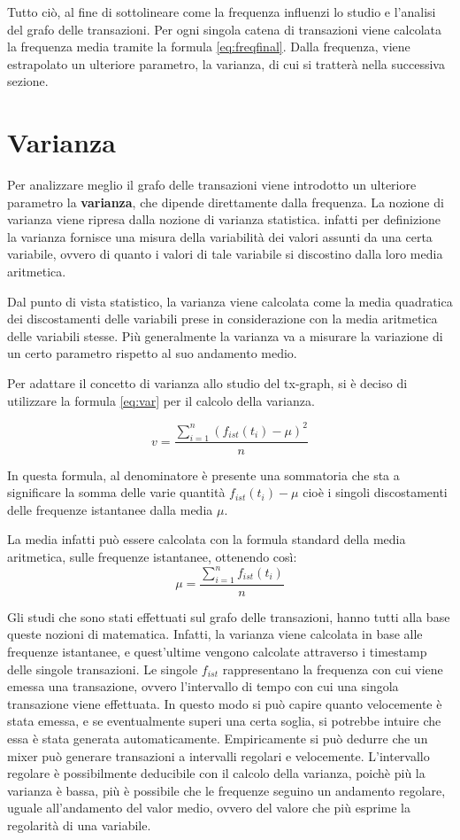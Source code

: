 Tutto ciò, al fine di sottolineare come la frequenza influenzi lo studio e l'analisi del grafo delle transazioni. Per ogni singola catena di transazioni viene calcolata la frequenza media tramite la formula \ref{eq:freqfinal}. Dalla frequenza, viene estrapolato un ulteriore parametro, la varianza, di cui si tratterà nella successiva sezione.

\section{Varianza}
Per analizzare meglio il grafo delle transazioni viene introdotto un ulteriore parametro la \textbf{varianza}, che dipende direttamente dalla frequenza. 
La nozione di varianza viene ripresa dalla nozione di varianza statistica. infatti per definizione la varianza fornisce una misura della variabilità dei valori assunti da una certa variabile, ovvero di quanto i valori di tale variabile si discostino dalla loro media aritmetica. \cite{wiki:varianza}

Dal punto di vista statistico, la varianza viene calcolata come la media quadratica dei discostamenti delle variabili prese in considerazione con la media aritmetica delle variabili stesse. Più generalmente la varianza va a misurare la variazione di un certo parametro rispetto al suo andamento medio.

Per adattare il concetto di varianza allo studio del tx-graph, si è deciso di utilizzare la formula \ref{eq:var} per il calcolo della varianza.

\begin{equation}
v =  \frac{ \sum_{i=1}^n (f_{ist}(t_i) - \mu )^2 }{n}
\label{eq:var}
\end{equation}

In questa formula, al denominatore è presente una sommatoria che sta a significare la somma delle varie quantità $f_{ist}(t_i) - \mu$ cioè i singoli discostamenti delle frequenze istantanee dalla media $\mu$.

La media infatti può essere calcolata con la formula standard della media aritmetica, sulle frequenze istantanee, ottenendo così:
\begin{equation}
	\mu = \frac{\sum_{i=1}^{n} f_{ist}(t_i)}{n}
\end{equation}

Gli studi che sono stati effettuati sul grafo delle transazioni, hanno tutti alla base queste nozioni di matematica. Infatti, la varianza viene calcolata in base alle frequenze istantanee, e quest'ultime vengono calcolate attraverso i timestamp delle singole transazioni. Le singole $f_{ist}$ rappresentano la frequenza con cui viene emessa una transazione, ovvero l'intervallo di tempo con cui una singola transazione viene effettuata. In questo modo si può capire quanto velocemente è stata emessa, e se eventualmente superi una certa soglia, si potrebbe intuire che essa è stata generata automaticamente. Empiricamente si può dedurre che un mixer può generare transazioni a intervalli regolari e velocemente. L'intervallo regolare è possibilmente deducibile con il calcolo della varianza, poichè più la varianza è bassa, più è possibile che le frequenze seguino un andamento regolare, uguale all'andamento del valor medio, ovvero del valore che più esprime la regolarità di una variabile.